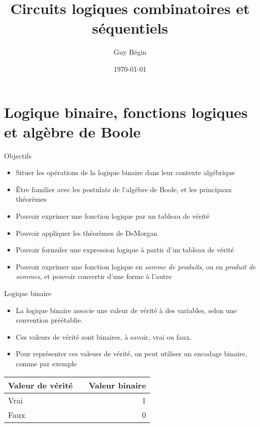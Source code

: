 \documentclass[presentation]{beamer}
\author{Guy Bégin}
\date{\today}
\title{Circuits logiques combinatoires et séquentiels}
\begin{document}
\maketitle

\section{Logique binaire, fonctions logiques et algèbre de Boole}
\label{sec:org628e4b3}


\begin{frame}[label={sec:org75276c0}]{Objectifs}
\begin{itemize}
\item Situer les opérations de la logique binaire dans leur contexte algébrique
\item Être familier avec les postulats de l'algèbre de Boole, et les
principaux théorèmes
\item Pouvoir exprimer une fonction logique par un tableau de vérité
\item Pouvoir appliquer les théorèmes de DeMorgan
\item Pouvoir formuler une expression logique à partir d'un tableau de vérité
\item Pouvoir exprimer une fonction logique en \emph{somme de produits}, ou en
\emph{produit de sommes}, et pouvoir convertir d'une forme à l'autre
\end{itemize}
\end{frame}

\begin{frame}[label={sec:orgcbdd598}]{Logique binaire}
\begin{itemize}
\item La logique binaire associe une valeur de vérité à des variables,
selon une convention préétablie.

\item Ces valeurs de vérité sont binaires, à savoir, \alert{vrai} ou \alert{faux}.

\item Pour représenter ces valeurs de vérité, on peut utiliser un encodage
binaire, comme par exemple
\end{itemize}

\begin{center}
\begin{tabular}{llr}
Valeur de vérité &  & Valeur binaire\\
\hline
Vrai &  & 1\\
Faux &  & 0\\
\end{tabular}
\end{center}
\end{frame}
\end{document}
